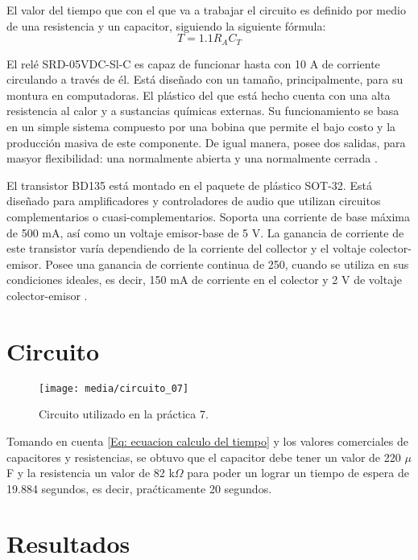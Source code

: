 \documentclass{article}
\begin{document}
El valor del tiempo que con el que va a trabajar el circuito es definido por medio de una resistencia y un capacitor, siguiendo la siguiente fórmula:
\begin{equation}
    T = 1.1 R_A C_T
    \label{Eq: ecuacion calculo del tiempo}
\end{equation}

El relé SRD-05VDC-Sl-C es  capaz de funcionar hasta con 10 A de corriente circulando a través de él. Está diseñado con un tamaño, principalmente, para su montura en computadoras. El plástico del que está hecho cuenta con una alta resistencia al calor y a sustancias químicas externas. Su funcionamiento se basa en un simple sistema compuesto por una bobina que permite el bajo costo y la producción masiva de este componente. De igual manera, posee dos salidas, para masyor flexibilidad: una normalmente abierta y una normalmente cerrada \parencite{alldatasheet_srd-05vdc-sl-c_nodate}.

El transistor BD135 está montado en el paquete de plástico SOT-32. Está diseñado para amplificadores y controladores de audio que utilizan circuitos complementarios o cuasi-complementarios. Soporta una corriente de base máxima de 500 mA, así como un voltaje emisor-base de 5 V. La ganancia de corriente de este transistor varía dependiendo de la corriente del collector y el voltaje colector-emisor. Posee una ganancia de corriente continua de 250, cuando se utiliza en sus condiciones ideales, es decir, 150 mA de corriente en el colector y 2 V de voltaje colector-emisor \parencite{stmicroelectronics_bd135_nodate}.

\section{Circuito}

\begin{figure}[htb]
    \centering
    \texttt{[image: media/circuito\_07]}
    \caption{Circuito utilizado en la práctica 7.}
    \label{Fig: Circuito utilizado en la practica 7}
\end{figure}

Tomando en cuenta \eqref{Eq: ecuacion calculo del tiempo} y los valores comerciales de capacitores y resistencias, se obtuvo que el capacitor debe tener un valor de 220 $\mu$F y la resistencia un valor de 82 k$\Omega$ para poder un lograr un tiempo de espera de 19.884 segundos, es decir, praćticamente 20 segundos.

\section{Resultados}
\end{document}
